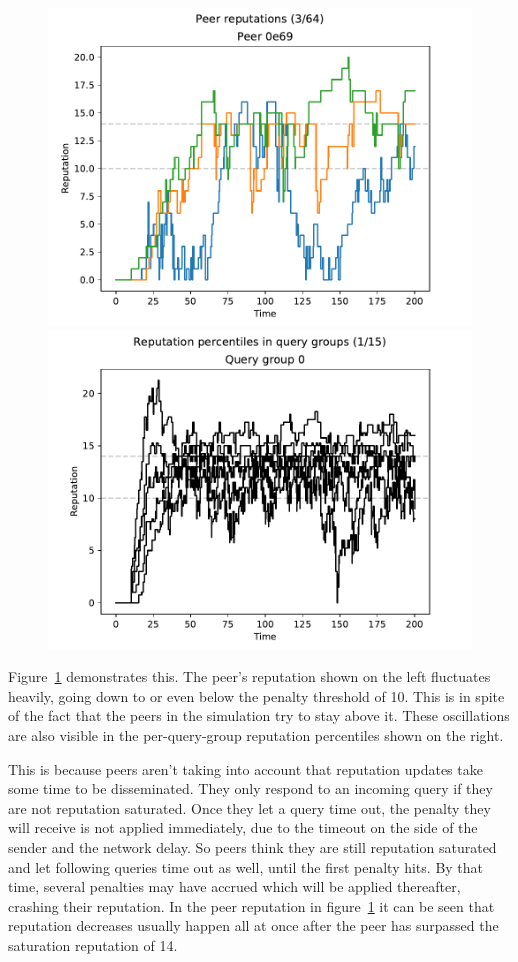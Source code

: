 \begin{figure}[t]
\centering
\includegraphics[width=0.5\columnwidth]{figures/expectations_off_no_att_peer_reps_3_of_64}%
\includegraphics[width=0.5\columnwidth]{figures/expectations_off_no_att_rep_percs_1_of_15}
\label{fig:penalty_expectations_off_no_att_peer_reps_percs}
\end{figure}

Figure~\ref{fig:penalty_expectations_off_no_att_peer_reps_percs} demonstrates
this. The peer's reputation shown on the left fluctuates heavily, going down to
or even below the penalty threshold of 10. This is in spite of the fact that the
peers in the simulation try to stay above it. These oscillations are also
visible in the per-query-group reputation percentiles shown on the right.

This is because peers aren't taking into account that reputation updates take
some time to be disseminated. They only respond to an incoming query if they are
not reputation saturated. Once they let a query time out, the penalty they will
receive is not applied immediately, due to the timeout on the side of the sender
and the network delay. So peers think they are still reputation saturated and
let following queries time out as well, until the first penalty hits. By that
time, several penalties may have accrued which will be applied thereafter,
crashing their reputation. In the peer reputation in
figure~\ref{fig:penalty_expectations_off_no_att_peer_reps_percs} it can be seen
that reputation decreases usually happen all at once after the peer has
surpassed the saturation reputation of 14.


